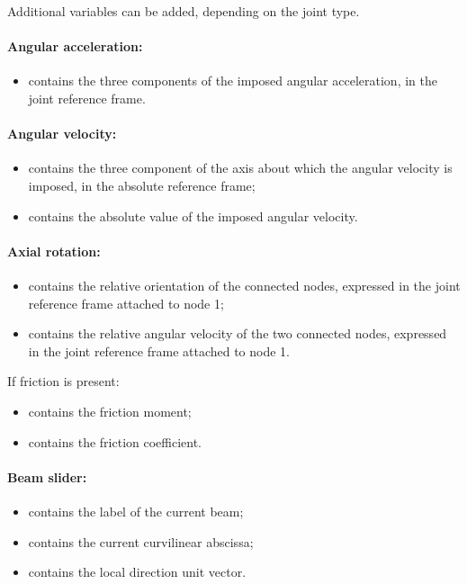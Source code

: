 Additional variables can be added, depending on the joint type. 

\paragraph{Angular acceleration:}
\begin{itemize}
\item {} contains the three components of the imposed
  angular acceleration, in the joint reference frame.
\end{itemize}

\paragraph{Angular velocity:}
\begin{itemize}
\item {} contains the three component of the axis about
  which the angular velocity is imposed, in the absolute reference frame;
\item {} contains the absolute value of the imposed
  angular velocity.
\end{itemize}

\paragraph{Axial rotation:}
\begin{itemize}
\item {} contains the relative orientation of the
  connected nodes, expressed in the joint reference frame attached to node 1;
\item {} contains the relative angular velocity
  of the two connected nodes, expressed in the joint reference frame attached to node 1.
\end{itemize}

If friction is present:
\begin{itemize}
\item {} contains the friction moment;
\item {} contains the friction coefficient.
\end{itemize}

\paragraph{Beam slider:}
\begin{itemize}
\item {} contains the label of the current beam;
\item {} contains the current curvilinear abscissa;
\item {} contains the local direction unit vector.
\end{itemize}


